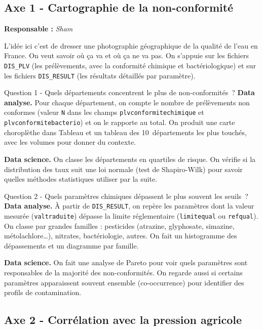 \documentclass[a4paper,11pt]{article}
\begin{document}
\subsection{Axe 1 - Cartographie de la non-conformité}

\textbf{Responsable :} {\itshape Sham}

L'idée ici c'est de dresser une photographie géographique de la qualité de l'eau en France. On veut savoir où ça va et où ça ne va pas. On s'appuie sur les fichiers \texttt{DIS\_PLV} (les prélèvements, avec la conformité chimique et bactériologique) et sur les fichiers \texttt{DIS\_RESULT} (les résultats détaillés par paramètre).

\begin{questionbox}{Question 1 - Quels départements concentrent le plus de non-conformités~?}
\textbf{Data analyse.} Pour chaque département, on compte le nombre de prélèvements non conformes (valeur \texttt{N} dans les champs \texttt{plvconformitechimique} et \texttt{plvconformitebacterio}) et on le rapporte au total. On produit une carte choroplèthe dans Tableau et un tableau des 10~départements les plus touchés, avec les volumes pour donner du contexte.\par\smallskip
\textbf{Data science.} On classe les départements en quartiles de risque. On vérifie si la distribution des taux suit une loi normale (test de Shapiro-Wilk) pour savoir quelles méthodes statistiques utiliser par la suite.
\end{questionbox}

\begin{questionbox}{Question 2 - Quels paramètres chimiques dépassent le plus souvent les seuils~?}
\textbf{Data analyse.} À partir de \texttt{DIS\_RESULT}, on repère les paramètres dont la valeur mesurée (\texttt{valtraduite}) dépasse la limite réglementaire (\texttt{limitequal} ou \texttt{refqual}). On classe par grandes familles : pesticides (atrazine, glyphosate, simazine, métolachlore\ldots), nitrates, bactériologie, autres. On fait un histogramme des dépassements et un diagramme par famille.\par\smallskip
\textbf{Data science.} On fait une analyse de Pareto pour voir quels paramètres sont responsables de la majorité des non-conformités. On regarde aussi si certains paramètres apparaissent souvent ensemble (co-occurrence) pour identifier des profils de contamination.
\end{questionbox}

\subsection{Axe 2 - Corrélation avec la pression agricole}
\end{document}
